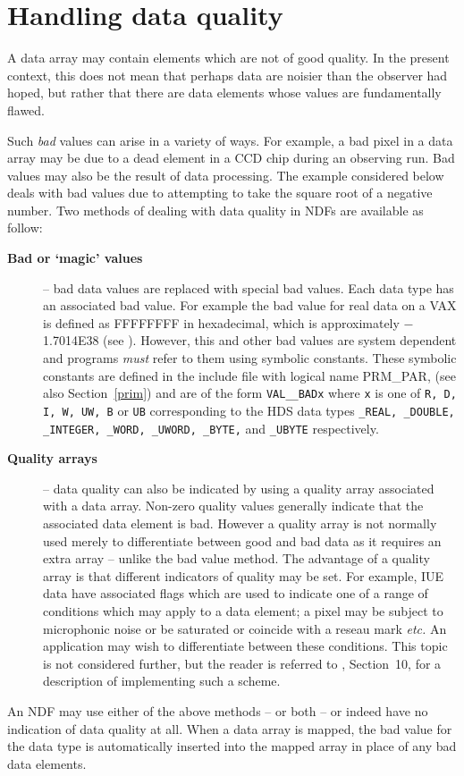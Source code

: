\newpage
\section{Handling data quality\label{badpix}}

A data array may contain elements which are not of good quality.
In the present context, this does not mean that perhaps data are noisier than 
the observer had hoped, 
but rather that there are data elements whose values are fundamentally 
flawed.

Such {\sl bad\/} values can arise in a variety of ways.
For example, a bad pixel in a  data array may be due to a dead element 
in a CCD chip during an observing run.
Bad values may also be the result of data processing. 
The example considered below deals with bad values due to
attempting to take the square root of a negative number.
Two methods of dealing with data quality in NDFs are 
available as follow:
\begin{description}
\item[{\bf Bad or `magic' values}] -- bad data values are replaced with special 
bad values. Each data type has an associated bad value. For example
the bad value for real data on a VAX is defined as
FFFFFFFF in hexadecimal,  which is approximately  $-$1.7014E38
(see ).
However, this and other bad values are system 
dependent and programs {\sl must\/} refer to them using symbolic 
constants. These symbolic constants are defined in the include file with 
logical name PRM\_PAR, (see also Section~\ref{prim}) and are of the form {\tt VAL\_\_BADx} where {\tt x} 
is one of {\tt R, D, I, W, UW, B} or {\tt UB}  corresponding to the 
HDS data types {\tt \_REAL,
\_DOUBLE, \_INTEGER, \_WORD, \_UWORD, \_BYTE,} and {\tt\_UBYTE} respectively.
\item[{\bf Quality arrays}] -- data quality can also be indicated by
using a quality array associated with a data array.
Non-zero quality values generally indicate that the 
associated data element is bad.
However a quality array is not normally used merely to 
differentiate between good 
and bad data as it requires an extra array -- unlike the bad value method.
The advantage of a quality array is that different indicators of 
quality may be set. For example, IUE data have associated flags which 
are used to indicate one of a range of conditions which may apply to a
data element; a pixel may be subject to microphonic noise 
or be saturated or coincide with a reseau mark {\it etc.}
An application may wish to differentiate between these conditions.
This topic is not considered further, but the reader is referred to
,
Section~10, for a description of implementing such a scheme.
\end{description}
An NDF may use either of the above methods -- or both  -- or indeed 
have no indication of data quality at all. 
When a data array is mapped,
the bad value for the data type 
is automatically inserted into the mapped array in place of any
bad data elements. 

